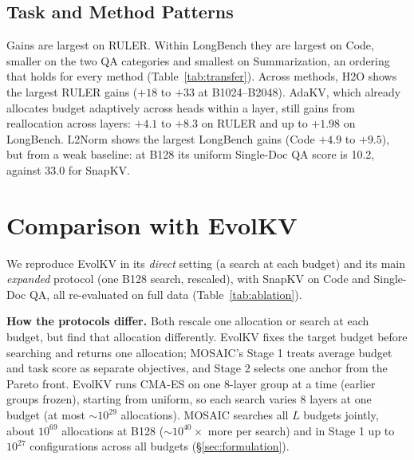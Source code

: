 \documentclass[11pt]{article}
\begin{document}
\subsection{Task and Method Patterns}

Gains are largest on RULER. Within LongBench they are largest on Code, smaller on the two QA categories and smallest on Summarization, an ordering that holds for every method (Table~\ref{tab:transfer}). Across methods, H2O shows the largest RULER gains ($+18$ to $+33$ at B1024--B2048). AdaKV, which already allocates budget adaptively across heads within a layer, still gains from reallocation across layers: $+4.1$ to $+8.3$ on RULER and up to $+1.98$ on LongBench. L2Norm shows the largest LongBench gains (Code $+4.9$ to $+9.5$), but from a weak baseline: at B128 its uniform Single-Doc QA score is 10.2, against 33.0 for SnapKV.

\section{Comparison with EvolKV}
\label{sec:evolkv}

We reproduce EvolKV \citep{yu2025evolkv} in its \emph{direct} setting (a search at each budget) and its main \emph{expanded} protocol (one B128 search, rescaled), with SnapKV on Code and Single-Doc QA, all re-evaluated on full data (Table~\ref{tab:ablation}).

\textbf{How the protocols differ.} Both rescale one allocation or search at each budget, but find that allocation differently. EvolKV fixes the target budget before searching and returns one allocation; MOSAIC's Stage 1 treats average budget and task score as separate objectives, and Stage 2 selects one anchor from the Pareto front. EvolKV runs CMA-ES on one 8-layer group at a time (earlier groups frozen), starting from uniform, so each search varies 8 layers at one budget (at most ${\sim}10^{29}$ allocations). MOSAIC searches all $L$ budgets jointly, about $10^{69}$ allocations at B128 (${\sim}10^{40}\times$ more per search) and in Stage 1 up to $10^{27}$ configurations across all budgets (\S\ref{sec:formulation}).
\end{document}
